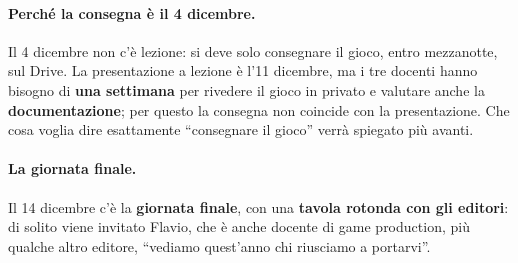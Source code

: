 \paragraph{Perché la consegna è il 4 dicembre.} Il 4 dicembre non c'è lezione:
si deve solo consegnare il gioco, entro mezzanotte, sul Drive. La presentazione
a lezione è l'11 dicembre, ma i tre docenti hanno bisogno di \textbf{una
settimana} per rivedere il gioco in privato e valutare anche la
\textbf{documentazione}; per questo la consegna non coincide con la
presentazione. Che cosa voglia dire esattamente ``consegnare il gioco'' verrà
spiegato più avanti.

\paragraph{La giornata finale.} Il 14 dicembre c'è la \textbf{giornata finale},
con una \textbf{tavola rotonda con gli editori}: di solito viene invitato Flavio,
che è anche docente di game production, più qualche altro editore, ``vediamo
quest'anno chi riusciamo a portarvi''.

